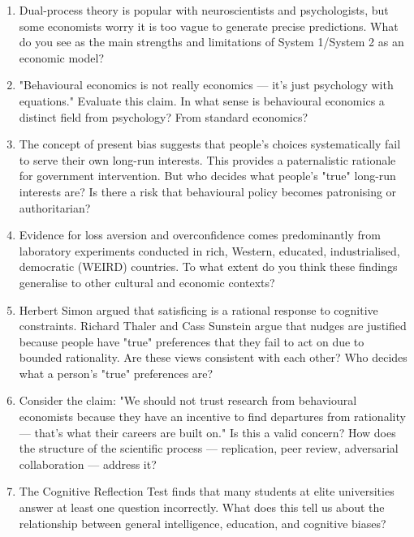 \documentclass[12pt, letterpaper]{article}
\begin{document}
\begin{enumerate}
\item Dual-process theory is popular with neuroscientists and psychologists, but some economists worry it is too vague to generate precise predictions. What do you see as the main strengths and limitations of System 1/System 2 as an economic model?

\item "Behavioural economics is not really economics --- it's just psychology with equations." Evaluate this claim. In what sense is behavioural economics a distinct field from psychology? From standard economics?

\item The concept of present bias suggests that people's choices systematically fail to serve their own long-run interests. This provides a paternalistic rationale for government intervention. But who decides what people's "true" long-run interests are? Is there a risk that behavioural policy becomes patronising or authoritarian?

\item Evidence for loss aversion and overconfidence comes predominantly from laboratory experiments conducted in rich, Western, educated, industrialised, democratic (WEIRD) countries. To what extent do you think these findings generalise to other cultural and economic contexts?

\item Herbert Simon argued that satisficing is a rational response to cognitive constraints. Richard Thaler and Cass Sunstein argue that nudges are justified because people have "true" preferences that they fail to act on due to bounded rationality. Are these views consistent with each other? Who decides what a person's "true" preferences are?

\item Consider the claim: "We should not trust research from behavioural economists because they have an incentive to find departures from rationality --- that's what their careers are built on." Is this a valid concern? How does the structure of the scientific process --- replication, peer review, adversarial collaboration --- address it?

\item The Cognitive Reflection Test finds that many students at elite universities answer at least one question incorrectly. What does this tell us about the relationship between general intelligence, education, and cognitive biases?


\end{enumerate}
\end{document}
